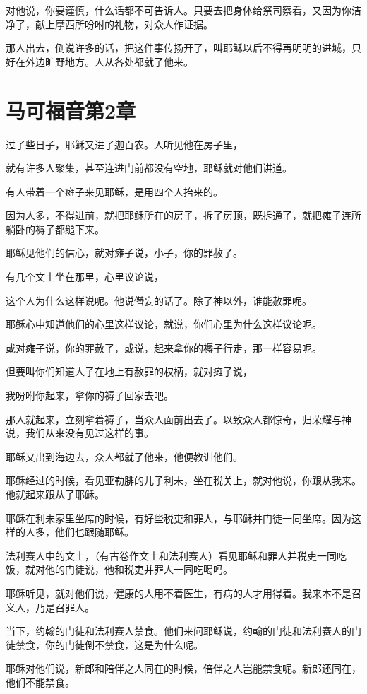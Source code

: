 \documentclass[12pt,oneside]{book}
\begin{document}
对他说，你要谨慎，什么话都不可告诉人。只要去把身体给祭司察看，又因为你洁净了，献上摩西所吩咐的礼物，对众人作证据。

那人出去，倒说许多的话，把这件事传扬开了，叫耶稣以后不得再明明的进城，只好在外边旷野地方。人从各处都就了他来。

\chapter{马可福音第2章}
过了些日子，耶稣又进了迦百农。人听见他在房子里，

就有许多人聚集，甚至连进门前都没有空地，耶稣就对他们讲道。

有人带着一个瘫子来见耶稣，是用四个人抬来的。

因为人多，不得进前，就把耶稣所在的房子，拆了房顶，既拆通了，就把瘫子连所躺卧的褥子都缒下来。

耶稣见他们的信心，就对瘫子说，小子，你的罪赦了。

有几个文士坐在那里，心里议论说，

这个人为什么这样说呢。他说僭妄的话了。除了神以外，谁能赦罪呢。

耶稣心中知道他们的心里这样议论，就说，你们心里为什么这样议论呢。

或对瘫子说，你的罪赦了，或说，起来拿你的褥子行走，那一样容易呢。

但要叫你们知道人子在地上有赦罪的权柄，就对瘫子说，

我吩咐你起来，拿你的褥子回家去吧。

那人就起来，立刻拿着褥子，当众人面前出去了。以致众人都惊奇，归荣耀与神说，我们从来没有见过这样的事。

耶稣又出到海边去，众人都就了他来，他便教训他们。

耶稣经过的时候，看见亚勒腓的儿子利未，坐在税关上，就对他说，你跟从我来。他就起来跟从了耶稣。

耶稣在利未家里坐席的时候，有好些税吏和罪人，与耶稣并门徒一同坐席。因为这样的人多，他们也跟随耶稣。

法利赛人中的文士，（有古卷作文士和法利赛人）看见耶稣和罪人并税吏一同吃饭，就对他的门徒说，他和税吏并罪人一同吃喝吗。

耶稣听见，就对他们说，健康的人用不着医生，有病的人才用得着。我来本不是召义人，乃是召罪人。

当下，约翰的门徒和法利赛人禁食。他们来问耶稣说，约翰的门徒和法利赛人的门徒禁食，你的门徒倒不禁食，这是为什么呢。

耶稣对他们说，新郎和陪伴之人同在的时候，倍伴之人岂能禁食呢。新郎还同在，他们不能禁食。
\end{document}
